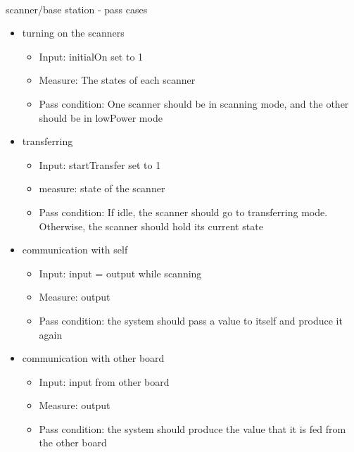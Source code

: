 \documentclass{article}
\begin{document}
    \paragraph{} scanner/base station - pass cases
    \begin{itemize}
      \item turning on the scanners
      \begin{itemize}
        \item Input: initialOn set to 1
        \item Measure: The states of each scanner
        \item Pass condition: One scanner should be in scanning mode, and the other should be in lowPower mode
      \end{itemize}

      \item transferring
      \begin{itemize}
        \item Input: startTransfer set to 1
        \item measure: state of the scanner
        \item Pass condition: If idle, the scanner should go to transferring mode. Otherwise, the scanner should hold its current state
      \end{itemize}

      \item communication with self
      \begin{itemize}
        \item Input: input = output while scanning
        \item Measure: output
        \item Pass condition: the system should pass a value to itself and produce it again
      \end{itemize}

      \item communication with other board
      \begin{itemize}
        \item Input: input from other board
        \item Measure: output
        \item Pass condition: the system should produce the value that it is fed from the other board
      \end{itemize}
    \end{itemize}
\end{document}
